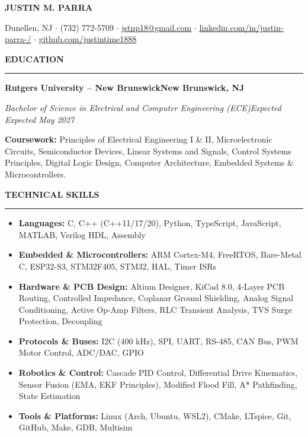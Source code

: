 \documentclass[10pt]{article}
\newcommand{\Section}[1]{%
  \vspace{4.0pt}%
  \textbf{\MakeUppercase{#1}}\par\vspace{-3.5pt}%
  \rule{\linewidth}{0.55pt}\par\vspace{2.5pt}%
}
\newcommand{\Company}[2]{\noindent\textbf{#1}\hfill\textbf{#2}\par}
\newcommand{\RoleDates}[2]{\noindent\textit{#1}\hfill\textit{#2}\par}
\begin{document}
\begin{center}
  {\LARGE \textbf{JUSTIN M. PARRA}}\par\vspace{2.0pt}
  \small Dunellen, NJ $\cdot$ (732) 772-5709 $\cdot$ \href{mailto:jstnp18@gmail.com}{\underline{jstnp18@gmail.com}} $\cdot$ \href{https://linkedin.com/in/justin-parra-/}{\underline{linkedin.com/in/justin-parra-/}} $\cdot$ \href{https://github.com/justintime1888}{\underline{github.com/justintime1888}}
\end{center}
\vspace{-6pt}

\Section{Education}
\Company{Rutgers University -- New Brunswick}{New Brunswick, NJ}
\RoleDates{Bachelor of Science in Electrical and Computer Engineering (ECE)}{Expected Expected May 2027}
\vspace{1pt}
\noindent\small{\textbf{Coursework:} Principles of Electrical Engineering I \& II, Microelectronic Circuits, Semiconductor Devices, Linear Systems and Signals, Control Systems Principles, Digital Logic Design, Computer Architecture, Embedded Systems \& Microcontrollers.}
\vspace{2pt}

\Section{Technical Skills}
\begin{itemize}
  \item \textbf{Languages:} C, C++ (C++11/17/20), Python, TypeScript, JavaScript, MATLAB, Verilog HDL, Assembly
  \item \textbf{Embedded \& Microcontrollers:} ARM Cortex-M4, FreeRTOS, Bare-Metal C, ESP32-S3, STM32F405, STM32, HAL, Timer ISRs
  \item \textbf{Hardware \& PCB Design:} Altium Designer, KiCad 8.0, 4-Layer PCB Routing, Controlled Impedance, Coplanar Ground Shielding, Analog Signal Conditioning, Active Op-Amp Filters, RLC Transient Analysis, TVS Surge Protection, Decoupling
  \item \textbf{Protocols \& Buses:} I2C (400 kHz), SPI, UART, RS-485, CAN Bus, PWM Motor Control, ADC/DAC, GPIO
  \item \textbf{Robotics \& Control:} Cascade PID Control, Differential Drive Kinematics, Sensor Fusion (EMA, EKF Principles), Modified Flood Fill, A* Pathfinding, State Estimation
  \item \textbf{Tools \& Platforms:} Linux (Arch, Ubuntu, WSL2), CMake, LTspice, Git, GitHub, Make, GDB, Multisim
\end{itemize}
\vspace{2pt}
\end{document}
